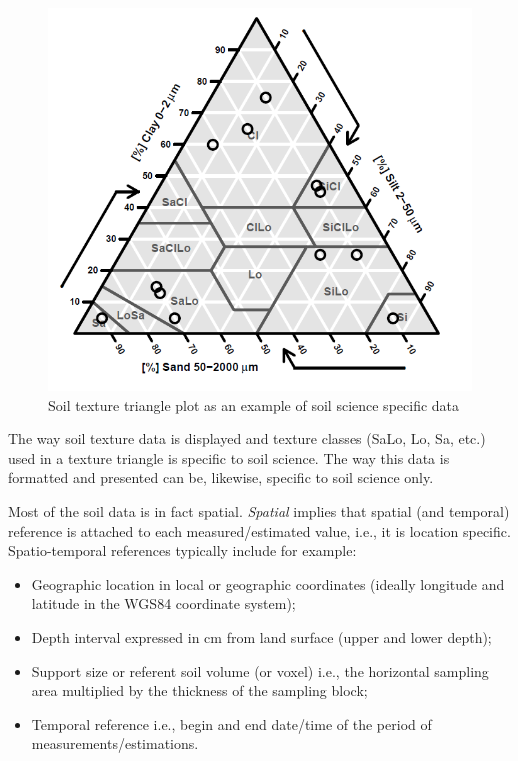 \documentclass[10pt,b5paper,]{book}
\providecommand{\tightlist}{%
  \setlength{\itemsep}{0pt}\setlength{\parskip}{0pt}}
\theoremstyle{definition}
\theoremstyle{definition}
\theoremstyle{definition}
\theoremstyle{remark}
\begin{document}
\begin{figure}
\centering
\includegraphics{images/Data_sharing_triangle.png}
\caption{Soil texture triangle plot as an example of soil science
specific data}
\end{figure}

The way soil texture data is displayed and texture classes (SaLo, Lo,
Sa, etc.) used in a texture triangle is specific to soil science. The
way this data is formatted and presented can be, likewise, specific to
soil science only.

Most of the soil data is in fact spatial. \emph{Spatial} implies that
spatial (and temporal) reference is attached to each measured/estimated
value, i.e., it is location specific. Spatio-temporal references
typically include for example:

\begin{itemize}
\tightlist
\item
  Geographic location in local or geographic coordinates (ideally
  longitude and latitude in the WGS84 coordinate system);
\item
  Depth interval expressed in cm from land surface (upper and lower
  depth);
\item
  Support size or referent soil volume (or voxel) i.e., the horizontal
  sampling area multiplied by the thickness of the sampling block;
\item
  Temporal reference i.e., begin and end date/time of the period of
  measurements/estimations.
\end{itemize}
\end{document}
